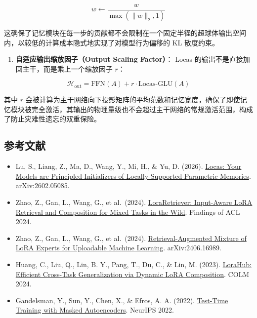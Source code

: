 \[
w \leftarrow \frac{w}{\max(\|w\|_2,1)}
\]

这确保了记忆模块在每一步的贡献都不会限制在一个固定半径的超球体输出空间内，以较低的计算成本隐式地实现了对模型行为偏移的 KL 散度约束。

\begin{enumerate}
\def\labelenumi{\arabic{enumi}.}
\setcounter{enumi}{1}
\tightlist
\item
  \textbf{自适应输出缩放因子（Output Scaling Factor）}：
  Locas 的输出不是直接加回主干，而是乘上一个缩放因子 \(r\)：
\end{enumerate}

\[
\mathcal{H}_{\mathrm{out}} = \mathrm{FFN}(A) + r \cdot \mathrm{Locas\text{-}GLU}(A)
\]

其中 \(r\) 会被计算为主干网络向下投影矩阵的平均范数和记忆宽度，确保了即使记忆模块被完全激活，其输出的物理量级也不会超过主干网络的常规激活范围，构成了防止灾难性遗忘的双重保险。

\hypertarget{ux53c2ux8003ux6587ux732e-150}{%
\subsection{参考文献}\label{ux53c2ux8003ux6587ux732e-150}}

\begin{itemize}
\tightlist
\item
  Lu, S., Liang, Z., Ma, D., Wang, Y., Mi, H., \& Yu, D. (2026). \href{https://arxiv.org/abs/2602.05085}{Locas: Your Models are Principled Initializers of Locally-Supported Parametric Memories}. arXiv:2602.05085.
\item
  Zhao, Z., Gan, L., Wang, G., et al.~(2024). \href{https://arxiv.org/abs/2402.09997}{LoraRetriever: Input-Aware LoRA Retrieval and Composition for Mixed Tasks in the Wild}. Findings of ACL 2024.
\item
  Zhao, Z., Gan, L., Wang, G., et al.~(2024). \href{https://arxiv.org/abs/2406.16989}{Retrieval-Augmented Mixture of LoRA Experts for Uploadable Machine Learning}. arXiv:2406.16989.
\item
  Huang, C., Liu, Q., Lin, B. Y., Pang, T., Du, C., \& Lin, M. (2023). \href{https://arxiv.org/abs/2307.13269}{LoraHub: Efficient Cross-Task Generalization via Dynamic LoRA Composition}. COLM 2024.
\item
  Gandelsman, Y., Sun, Y., Chen, X., \& Efros, A. A. (2022). \href{https://arxiv.org/abs/2209.07522}{Test-Time Training with Masked Autoencoders}. NeurIPS 2022.
\end{itemize}

